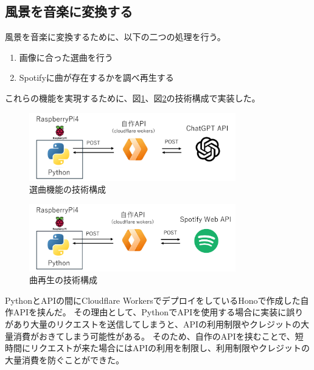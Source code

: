 \subsection{風景を音楽に変換する}
風景を音楽に変換するために、以下の二つの処理を行う。
\begin{enumerate}
  \item 画像に合った選曲を行う
  \item Spotifyに曲が存在するかを調べ再生する
\end{enumerate}
これらの機能を実現するために、図\ref{fig:image-to-select-music}、図\ref{fig:music-play}の技術構成で実装した。
\begin{figure}[h]
  \centering
  \includegraphics[width=0.8\textwidth]{pages/report/images/opeai-api.png}
  \caption{選曲機能の技術構成}
  \label{fig:image-to-select-music}
\end{figure}
\begin{figure}[h]
  \centering
  \includegraphics[width=0.8\textwidth]{pages/report/images/music-play.png}
  \caption{曲再生の技術構成}
  \label{fig:music-play}
\end{figure}
PythonとAPIの間にCloudflare WorkersでデプロイをしているHonoで作成した自作APIを挟んだ。
その理由として、PythonでAPIを使用する場合に実装に誤りがあり大量のリクエストを送信してしまうと、APIの利用制限やクレジットの大量消費がおきてしまう可能性がある。
そのため、自作のAPIを挟むことで、短時間にリクエストが来た場合にはAPIの利用を制限し、利用制限やクレジットの大量消費を防ぐことができた。

